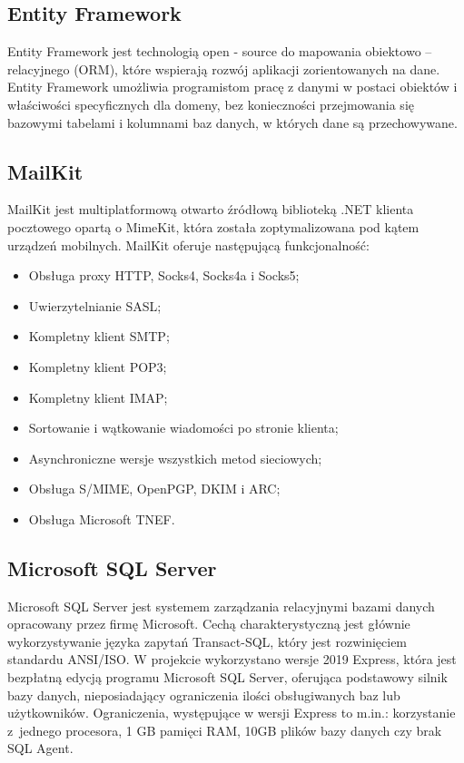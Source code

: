 \documentclass[12pt,a4paper]{article}
\begin{document}
		\subsection{Entity Framework}		 
		 	\indent Entity Framework jest technologią open - source do mapowania obiektowo – relacyjnego (ORM), które wspierają rozwój aplikacji zorientowanych na dane.
		 	Entity Framework umożliwia programistom pracę z danymi w postaci obiektów i właściwości specyficznych dla domeny, bez konieczności przejmowania się bazowymi
		 	tabelami i kolumnami baz danych, w których dane są przechowywane. 

		\subsection{MailKit}
			\indent MailKit jest multiplatformową otwarto źródłową biblioteką .NET klienta pocztowego opartą o MimeKit, która została zoptymalizowana pod kątem urządzeń mobilnych.
			MailKit oferuje następującą funkcjonalność:
			\begin{itemize}
				\item Obsługa proxy HTTP, Socks4, Socks4a i Socks5;
				\item Uwierzytelnianie SASL;
				\item Kompletny klient SMTP;
				\item Kompletny klient POP3;
				\item Kompletny klient IMAP;
				\item Sortowanie i wątkowanie wiadomości po stronie klienta;
				\item Asynchroniczne wersje wszystkich metod sieciowych;
				\item Obsługa S/MIME, OpenPGP, DKIM i ARC;
				\item Obsługa Microsoft TNEF.
			\end{itemize}

		\subsection{Microsoft SQL Server}		 
		 	\indent Microsoft SQL Server jest systemem zarządzania relacyjnymi bazami danych opracowany przez firmę Microsoft. Cechą charakterystyczną jest głównie wykorzystywanie języka
		 	zapytań	Transact-SQL, który jest rozwinięciem standardu ANSI/ISO. W projekcie wykorzystano wersje 2019 Express, która jest bezpłatną edycją programu Microsoft SQL Server, oferująca
		 	podstawowy silnik bazy danych, nieposiadający ograniczenia ilości obsługiwanych baz lub użytkowników. Ograniczenia, występujące w wersji Express to  m.in.:
		 	korzystanie z~jednego procesora, 1 GB pamięci RAM, 10GB plików bazy danych czy brak SQL Agent.
\end{document}
